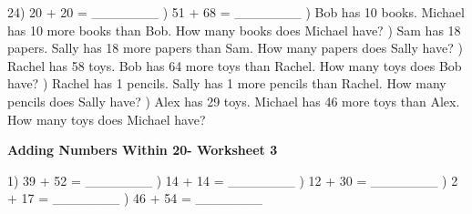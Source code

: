 \documentclass{article}%
\begin{document}
24) 20 + 20 = \_\_\_\_\_\_\_%
\newline%
\newline%
) 51 + 68 = \_\_\_\_\_\_\_%
\newline%
\newline%
) Bob has 10 books. Michael has 10 more books than Bob. How many books does Michael have?%
\newline%
\newline%
) Sam has 18 papers. Sally has 18 more papers than Sam. How many papers does Sally have?%
\newline%
\newline%
) Rachel has 58 toys. Bob has 64 more toys than Rachel. How many toys does Bob have?%
\newline%
\newline%
) Rachel has 1 pencils. Sally has 1 more pencils than Rachel. How many pencils does Sally have?%
\newline%
\newline%
) Alex has 29 toys. Michael has 46 more toys than Alex. How many toys does Michael have?%
\newline%
\newline%
\newline%
\pagebreak%
\large%
\begin{center}%
\textbf{Adding Numbers Within 20- Worksheet 3}%
\newline%
\end{center} \normalsize%
1) 39 + 52 = \_\_\_\_\_\_\_%
\newline%
\newline%
) 14 + 14 = \_\_\_\_\_\_\_%
\newline%
\newline%
) 12 + 30 = \_\_\_\_\_\_\_%
\newline%
\newline%
) 2 + 17 = \_\_\_\_\_\_\_%
\newline%
\newline%
) 46 + 54 = \_\_\_\_\_\_\_%
\newline%
\end{document}
